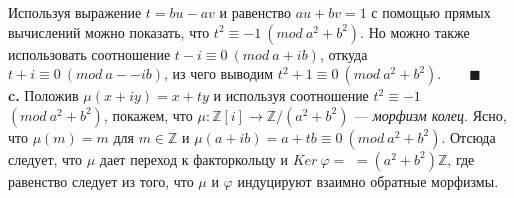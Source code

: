 \documentclass{mai_book}
\begin{document}
\hspace*{10pt} Используя выражение $t=bu-av$ и равенство $au+bv=1$ с помощью\linebreak
прямых вычислений можно показать, что $t^2\equiv-1 ~(mod~a^2+b^2)$. Но\linebreak
можно также использовать соотношение $t-i\equiv0~(mod~a+ib)$, откуда\linebreak
$t+i\equiv0~(mod~a--ib)$, из чего выводим $t^2+1\equiv0~(mod~a^2+b^2)$.$\qquad \blacksquare$ \linebreak
\\
\hspace*{15pt}\textbf{c.} Положив $\mu(x+iy)=x+ty$ и используя соотношение $t^2\equiv-1$\linebreak
$(mod~a^2+b^2)$, покажем, что $\mu:\mathbb{Z}[i]\rightarrow\mathbb{Z}/(a^2+b^2)$ --- \textit{морфизм колец}.\linebreak
Ясно, что $\mu(m)=m$ для $m\in\mathbb{Z}$ и $\mu(a+ib)=a+tb\equiv0~(mod~a^2+b^2)$.\linebreak
Отсюда следует, что $\mu$ дает переход к факторкольцу и $Ker~\varphi=$\linebreak
$=(a^2+b^2)\mathbb{Z}$, где равенство следует из того, что $\mu$ и $\varphi$ индуцируют\linebreak
взаимно обратные морфизмы.\newpage
%
\end{document}
